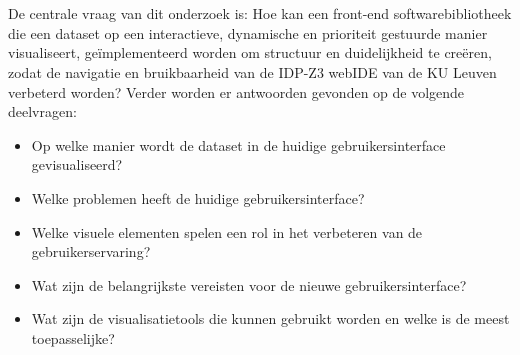 \section{}%
\label{sec:onderzoeksvraag}
De centrale vraag van dit onderzoek is: Hoe kan een front-end softwarebibliotheek die een dataset op een interactieve, dynamische en prioriteit gestuurde manier visualiseert, geïmplementeerd worden om structuur en duidelijkheid te creëren, zodat de navigatie en bruikbaarheid van de IDP-Z3 webIDE van de KU Leuven verbeterd worden? Verder worden er antwoorden gevonden op de volgende deelvragen:
\begin{itemize}
    \item Op welke manier wordt de dataset in de huidige gebruikersinterface gevisualiseerd?
    \item Welke problemen heeft de huidige gebruikersinterface?
    \item Welke visuele elementen spelen een rol in het verbeteren van de gebruikerservaring?
    \item Wat zijn de belangrijkste vereisten voor de nieuwe gebruikersinterface?
    \item Wat zijn de visualisatietools die kunnen gebruikt worden en welke is de meest toepasselijke?
\end{itemize}



